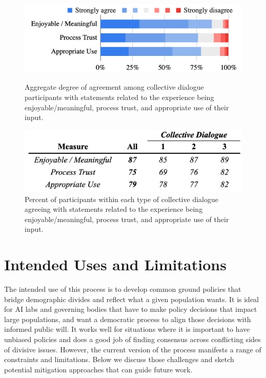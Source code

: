 \documentclass{article}
\begin{document}
\begin{figure}[H]
\centering
\begin{minipage}{.48\textwidth}
  \centering
  \hspace{-2cm}
  \includegraphics[width=1.2\linewidth]{figs/experience_eval.png}
  \caption{Aggregate degree of agreement among collective dialogue participants with statements related to the experience being enjoyable/meaningful, process trust, and appropriate use of their input.}
  \label{fig:experience eval}
\end{minipage}
%
\begin{minipage}{.5\textwidth} 
\end{minipage}
\begin{minipage}{.48\textwidth}
  \centering
  \includegraphics[width=1.1\linewidth]{figs/experience_eval_table.png}
  \caption[width=0.9\linewidth]{Percent of participants within each type of collective dialogue agreeing with statements related to the experience being enjoyable/meaningful, process trust, and appropriate use of their input.}
  \label{fig:experience eval table}
\end{minipage}
\end{figure}



\section{Intended Uses and Limitations}
The intended use of this process is to develop common ground policies that bridge demographic divides and reflect what a given population wants. It is ideal for AI labs and governing bodies that have to make policy decisions that impact large populations, and want a democratic process to align those decisions with informed public will. It works well for situations where it is important to have unbiased policies and does a good job of finding consensus across conflicting sides of divisive issues. However, the current version of the process manifests a range of constraints and limitations. Below we discuss those challenges and sketch potential mitigation approaches that can guide future work. 
\end{document}
